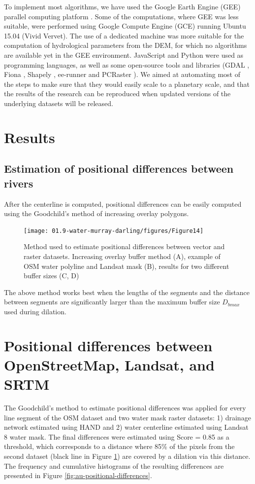 To implement most algorithms, we have used the Google Earth Engine (GEE) parallel computing platform \citet{Gorelick2012}. Some of the computations, where GEE was less suitable, were performed using Google Compute Engine (GCE) running Ubuntu 15.04 (Vivid Vervet). The use of a dedicated machine was more suitable for the computation of hydrological parameters from the DEM, for which no algorithms are available yet in the GEE environment. JavaScript and Python were used as programming languages, as well as some open-source tools and libraries (GDAL \citet{webGDAL}, Fiona \citet{webFiona}, Shapely \citet{webShapely}, ee-runner \citet{webEErunner} and PCRaster \citet{Karssenberg2010}). We aimed at automating most of the steps to make sure that they would easily scale to a planetary scale, and that the results of the research can be reproduced when updated versions of the underlying datasets will be released.

\section{Results}
\subsection{Estimation of positional differences between rivers}
After the centerline is computed, positional differences can be easily computed using the Goodchild’s method of increasing overlay polygons.

\begin{figure}
	\centering
	\texttt{[image: 01.9-water-murray-darling/figures/Figure14]}
	\caption{Method used to estimate positional differences between vector and raster datasets. Increasing overlay buffer method (A), example of OSM water polyline and Landsat mask (B), results for two different buffer sizes (C, D)}
	\label{fig:au-positional-accurracy-method}
\end{figure}

The above method works best when the lengths of the segments and the distance between segments are significantly larger than the maximum buffer size $D_{bmax}$ used during dilation. 

\section {Positional differences between OpenStreetMap, Landsat, and SRTM}
The Goodchild’s method to estimate positional differences was applied for every line segment of the OSM dataset and two water mask raster datasets: 1) drainage network estimated using HAND and 2) water centerline estimated using Landsat 8 water mask. The final differences were estimated using Score = 0.85 as a threshold, which corresponds to a distance where 85\% of the pixels from the second dataset (black line in Figure \ref{fig:au-positional-accurracy-method}) are covered by a dilation via this distance. The frequency and cumulative histograms of the resulting differences are presented in Figure \ref{fig:au-positional-differences}. 

